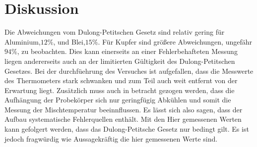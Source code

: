 \section{Diskussion}
\label{sec:Diskussion}
Die Abweichungen vom Dulong-Petitschen Gesetz sind relativ gering für Aluminium,$12\%$, und Blei,$15\%$.
Für Kupfer sind größere Abweichungen, ungefähr $94\%$, zu beobachten.
Dies kann einerseits an einer Fehlerbehafteten Messung liegen andererseits auch an der limitierten Gültigkeit des Dulong-Petitschen Gesetzes.
Bei der durchfüehrung des Versuches ist aufgefallen, dass die Messwerte des Thermometers stark schwanken und zum Teil auch weit entfernt von der Erwartung liegt.
Zusätzlich muss auch in betracht gezogen werden, dass die Aufhängung der Probekörper sich nur geringfügig Abkühlen und somit die Messung der Mischtemperatur beeinnflussen.
Es lässt sich also sagen, dass der Aufbau systematische Fehlerquellen enthält.
Mit den Hier gemessenen Werten kann gefolgert werden, dass das Dulong-Petitsche Gesetz nur bedingt gilt.
Es ist jedoch fragwürdig wie Aussagekräftig die hier gemessenen Werte sind.
